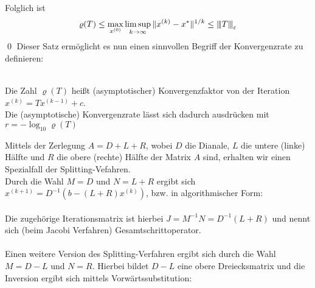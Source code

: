 \documentclass{article}
\begin{document}
Folglich ist 
\[\varrho(T) \le \max_{x^{(0)}} \limsup_{k\rightarrow \infty} \|x^{(k)}-x^*\|^{1/k}\le {\left\vert\kern-0.25ex\left\vert\kern-0.25ex\left\vert T \right\vert\kern-0.25ex\right\vert\kern-0.25ex\right\vert}_\varepsilon\]
\qed
Dieser Satz ermöglicht es nun einen sinnvollen Begriff der Konvergenzrate zu definieren:
\begin{defbox} \\
    Die Zahl $\varrho(T)$ heißt (asymptotischer) Konvergenzfaktor von der Iteration $x^{(k)}=Tx^{(k-1)}+c$. \\
    Die (asymptotische) Konvergenzrate lässt sich dadurch ausdrücken mit $r=-\log_{10}\varrho(T)$
\end{defbox}
Mittels der Zerlegung $A=D+L+R$, wobei $D$ die Dianale, $L$ die untere (linke) Hälfte und $R$ die obere (rechte) Hälfte der Matrix $A$ sind, erhalten wir einen Spezialfall der Splitting-Vefahren. \\
Durch die Wahl $M=D$ und $N=L+R$ ergibt sich $x^{(k+1)}=D^{-1}(b - (L+R)x^{(k)})$, bzw. in algorithmischer Form:\\ \\
Die zugehörige Iterationsmatrix ist hierbei $J=M^{-1}N = D^{-1}(L+R)$ und nennt sich (beim Jacobi Verfahren) Gesamtschrittoperator. \\ \\
Einen weitere Version des Splitting-Verfahren ergibt sich durch die Wahl $M=D-L$ und $N=R$.
Hierbei bildet $D-L$ eine obere Dreiecksmatrix und die Inversion ergibt sich mittels Vorwärtssubstitution: \\ \\
\end{document}
